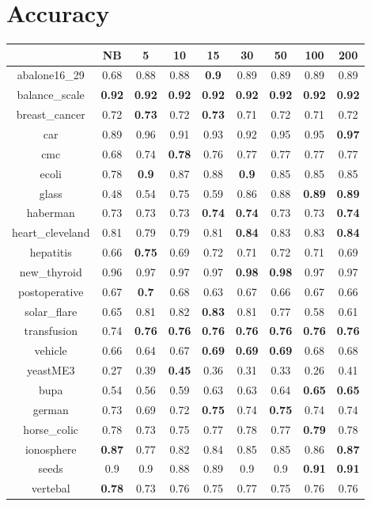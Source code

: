\documentclass{article}%
\begin{document}
%
\normalsize%
\section*{Accuracy}%
\begin{tabular}{c|cccccccc}%
\hline%
&NB&5&10&15&30&50&100&200\\%
\hline%
abalone16\_29&0.68&0.88&0.88&\textbf{0.9}&0.89&0.89&0.89&0.89\\%
\hline%
balance\_scale&\textbf{0.92}&\textbf{0.92}&\textbf{0.92}&\textbf{0.92}&\textbf{0.92}&\textbf{0.92}&\textbf{0.92}&\textbf{0.92}\\%
\hline%
breast\_cancer&0.72&\textbf{0.73}&0.72&\textbf{0.73}&0.71&0.72&0.71&0.72\\%
\hline%
car&0.89&0.96&0.91&0.93&0.92&0.95&0.95&\textbf{0.97}\\%
\hline%
cmc&0.68&0.74&\textbf{0.78}&0.76&0.77&0.77&0.77&0.77\\%
\hline%
ecoli&0.78&\textbf{0.9}&0.87&0.88&\textbf{0.9}&0.85&0.85&0.85\\%
\hline%
glass&0.48&0.54&0.75&0.59&0.86&0.88&\textbf{0.89}&\textbf{0.89}\\%
\hline%
haberman&0.73&0.73&0.73&\textbf{0.74}&\textbf{0.74}&0.73&0.73&\textbf{0.74}\\%
\hline%
heart\_cleveland&0.81&0.79&0.79&0.81&\textbf{0.84}&0.83&0.83&\textbf{0.84}\\%
\hline%
hepatitis&0.66&\textbf{0.75}&0.69&0.72&0.71&0.72&0.71&0.69\\%
\hline%
new\_thyroid&0.96&0.97&0.97&0.97&\textbf{0.98}&\textbf{0.98}&0.97&0.97\\%
\hline%
postoperative&0.67&\textbf{0.7}&0.68&0.63&0.67&0.66&0.67&0.66\\%
\hline%
solar\_flare&0.65&0.81&0.82&\textbf{0.83}&0.81&0.77&0.58&0.61\\%
\hline%
transfusion&0.74&\textbf{0.76}&\textbf{0.76}&\textbf{0.76}&\textbf{0.76}&\textbf{0.76}&\textbf{0.76}&\textbf{0.76}\\%
\hline%
vehicle&0.66&0.64&0.67&\textbf{0.69}&\textbf{0.69}&\textbf{0.69}&0.68&0.68\\%
\hline%
yeastME3&0.27&0.39&\textbf{0.45}&0.36&0.31&0.33&0.26&0.41\\%
\hline%
bupa&0.54&0.56&0.59&0.63&0.63&0.64&\textbf{0.65}&\textbf{0.65}\\%
\hline%
german&0.73&0.69&0.72&\textbf{0.75}&0.74&\textbf{0.75}&0.74&0.74\\%
\hline%
horse\_colic&0.78&0.73&0.75&0.77&0.78&0.77&\textbf{0.79}&0.78\\%
\hline%
ionosphere&\textbf{0.87}&0.77&0.82&0.84&0.85&0.85&0.86&\textbf{0.87}\\%
\hline%
seeds&0.9&0.9&0.88&0.89&0.9&0.9&\textbf{0.91}&\textbf{0.91}\\%
\hline%
vertebal&\textbf{0.78}&0.73&0.76&0.75&0.77&0.75&0.76&0.76\\%
\hline%
\end{tabular}
\end{document}
